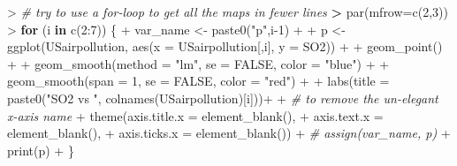 \documentclass[
]{article}
\newenvironment{Shaded}{\begin{snugshade}}{\end{snugshade}}
\newcommand{\AttributeTok}[1]{\textcolor[rgb]{0.77,0.63,0.00}{#1}}
\newcommand{\CommentTok}[1]{\textcolor[rgb]{0.56,0.35,0.01}{\textit{#1}}}
\newcommand{\ConstantTok}[1]{\textcolor[rgb]{0.00,0.00,0.00}{#1}}
\newcommand{\ControlFlowTok}[1]{\textcolor[rgb]{0.13,0.29,0.53}{\textbf{#1}}}
\newcommand{\DecValTok}[1]{\textcolor[rgb]{0.00,0.00,0.81}{#1}}
\newcommand{\ErrorTok}[1]{\textcolor[rgb]{0.64,0.00,0.00}{\textbf{#1}}}
\newcommand{\FunctionTok}[1]{\textcolor[rgb]{0.00,0.00,0.00}{#1}}
\newcommand{\NormalTok}[1]{#1}
\newcommand{\OtherTok}[1]{\textcolor[rgb]{0.56,0.35,0.01}{#1}}
\newcommand{\SpecialCharTok}[1]{\textcolor[rgb]{0.00,0.00,0.00}{#1}}
\newcommand{\StringTok}[1]{\textcolor[rgb]{0.31,0.60,0.02}{#1}}
\begin{document}
\begin{Shaded}
\begin{Highlighting}[]
\SpecialCharTok{\textgreater{}} \CommentTok{\# try to use a for{-}loop to get all the maps in fewer lines}
\ErrorTok{\textgreater{}} \FunctionTok{par}\NormalTok{(}\AttributeTok{mfrow=}\FunctionTok{c}\NormalTok{(}\DecValTok{2}\NormalTok{,}\DecValTok{3}\NormalTok{))}
\SpecialCharTok{\textgreater{}} \ControlFlowTok{for}\NormalTok{ (i }\ControlFlowTok{in} \FunctionTok{c}\NormalTok{(}\DecValTok{2}\SpecialCharTok{:}\DecValTok{7}\NormalTok{)) \{}
\SpecialCharTok{+}\NormalTok{   var\_name }\OtherTok{\textless{}{-}} \FunctionTok{paste0}\NormalTok{(}\StringTok{"p"}\NormalTok{,i}\DecValTok{{-}1}\NormalTok{)}
\SpecialCharTok{+}   
\SpecialCharTok{+}\NormalTok{   p }\OtherTok{\textless{}{-}} \FunctionTok{ggplot}\NormalTok{(USairpollution, }\FunctionTok{aes}\NormalTok{(}\AttributeTok{x =}\NormalTok{ USairpollution[,i], }\AttributeTok{y =}\NormalTok{ SO2)) }\SpecialCharTok{+} 
\SpecialCharTok{+}                 \FunctionTok{geom\_point}\NormalTok{() }\SpecialCharTok{+}
\SpecialCharTok{+}                 \FunctionTok{geom\_smooth}\NormalTok{(}\AttributeTok{method =} \StringTok{"lm"}\NormalTok{, }\AttributeTok{se =} \ConstantTok{FALSE}\NormalTok{, }\AttributeTok{color =} \StringTok{"blue"}\NormalTok{) }\SpecialCharTok{+}
\SpecialCharTok{+}                 \FunctionTok{geom\_smooth}\NormalTok{(}\AttributeTok{span =} \DecValTok{1}\NormalTok{, }\AttributeTok{se =} \ConstantTok{FALSE}\NormalTok{, }\AttributeTok{color =} \StringTok{"red"}\NormalTok{) }\SpecialCharTok{+}
\SpecialCharTok{+}                 \FunctionTok{labs}\NormalTok{(}\AttributeTok{title =} \FunctionTok{paste0}\NormalTok{(}\StringTok{"SO2 vs "}\NormalTok{, }\FunctionTok{colnames}\NormalTok{(USairpollution)[i]))}\SpecialCharTok{+}
\SpecialCharTok{+}                 \CommentTok{\# to remove the un{-}elegant x{-}axis name}
\SpecialCharTok{+}                 \FunctionTok{theme}\NormalTok{(}\AttributeTok{axis.title.x =} \FunctionTok{element\_blank}\NormalTok{(),}
\SpecialCharTok{+}                       \AttributeTok{axis.text.x =} \FunctionTok{element\_blank}\NormalTok{(),}
\SpecialCharTok{+}                       \AttributeTok{axis.ticks.x =} \FunctionTok{element\_blank}\NormalTok{())}
\SpecialCharTok{+}   \CommentTok{\# assign(var\_name, p)}
\SpecialCharTok{+}   \FunctionTok{print}\NormalTok{(p)}
\SpecialCharTok{+}\NormalTok{ \}}
\end{Highlighting}
\end{Shaded}
\end{document}
